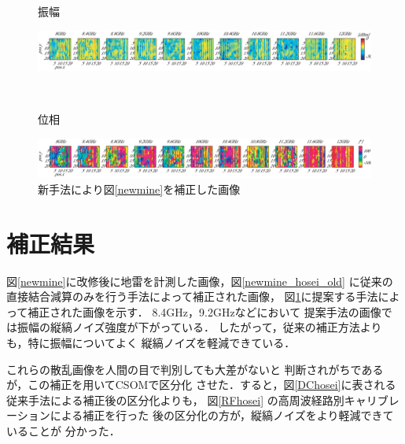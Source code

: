 ﻿\documentclass[12pt,oneside]{jsbook}
\begin{document}
\begin{figure}[ht]
 \begin{center}
     \begin{minipage}[c]{0.05\hsize}
振幅
  \end{minipage}
     \begin{minipage}[c]{0.94\hsize}
\includegraphics[width = \hsize ]{mine_hosei_abs.eps}
  \end{minipage}
\\
     \begin{minipage}[c]{0.05\hsize}
位相
  \end{minipage}
     \begin{minipage}[c]{0.94\hsize}
\includegraphics[width =\hsize ]{mine_hosei_pha.eps}
  \end{minipage}
\caption{新手法により図\ref{newmine}を補正した画像}
\label{newmine_hosei}
 \end{center}
\end{figure}
\section{補正結果}
図\ref{newmine}に改修後に地雷を計測した画像，図\ref{newmine_hosei_old}
に従来の直接結合減算のみを行う手法によって補正された画像，
図\ref{newmine_hosei}に提案する手法によって補正された画像を示す．
8.4GHz，9.2GHzなどにおいて
提案手法の画像では振幅の縦縞ノイズ強度が下がっている．
したがって，従来の補正方法よりも，特に振幅についてよく
縦縞ノイズを軽減できている．

これらの散乱画像を人間の目で判別しても大差がないと
判断されがちであるが，この補正を用いてCSOMで区分化
させた．すると，図\ref{DChosei}に表される
従来手法による補正後の区分化よりも，
図\ref{RFhosei}
の高周波経路別キャリブレーションによる補正を行った
後の区分化の方が，縦縞ノイズをより軽減できていることが
分かった．
\end{document}
